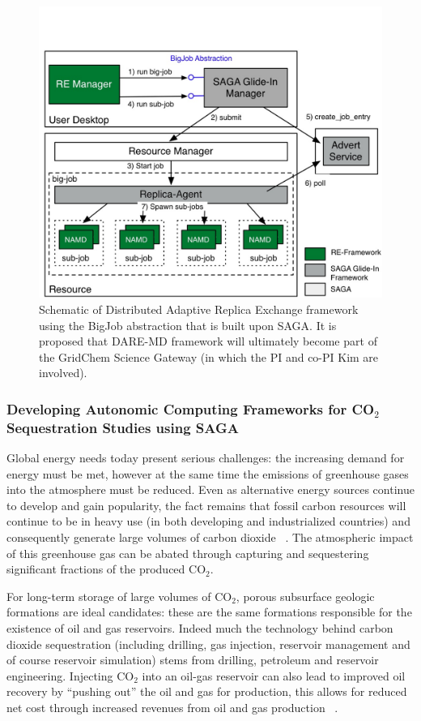 \documentclass[a4paper,10pt]{article}
\begin{document}
\begin{figure} \begin{center} \includegraphics[scale=0.55]{DARE-MD} \end{center} \caption{Schematic of Distributed Adaptive Replica Exchange framework using the BigJob abstraction that is built upon SAGA. It is proposed that DARE-MD framework will ultimately become part of the GridChem Science Gateway (in which the PI and co-PI Kim are involved).} \label{fig:results} \end{figure}

\subsubsection*{Developing Autonomic Computing Frameworks for CO$_2$ Sequestration Studies using SAGA}

Global energy needs today present serious challenges: the increasing demand for energy must be met, however at the same time the emissions of greenhouse gases into the atmosphere must be reduced. Even as alternative energy sources continue to develop and gain popularity, the fact remains that fossil carbon resources will continue to be in heavy use (in both developing and industrialized countries) and consequently generate large volumes of carbon dioxide ~\cite{GeoRPT}. The atmospheric impact of this greenhouse gas can be abated through capturing and sequestering significant fractions of the produced CO$_2$.

For long-term storage of large volumes of CO$_2$, porous subsurface geologic formations are ideal candidates: these are the same formations responsible for the existence of oil and gas reservoirs. Indeed much the technology behind carbon dioxide sequestration (including drilling, gas injection, reservoir management and of course reservoir simulation) stems from drilling, petroleum and reservoir engineering. Injecting CO$_2$ into an oil-gas reservoir can also lead to improved oil recovery by ``pushing out'' the oil and gas for production, this allows for reduced net cost through increased revenues from oil and gas production ~\cite{EORBook}.
\end{document}
